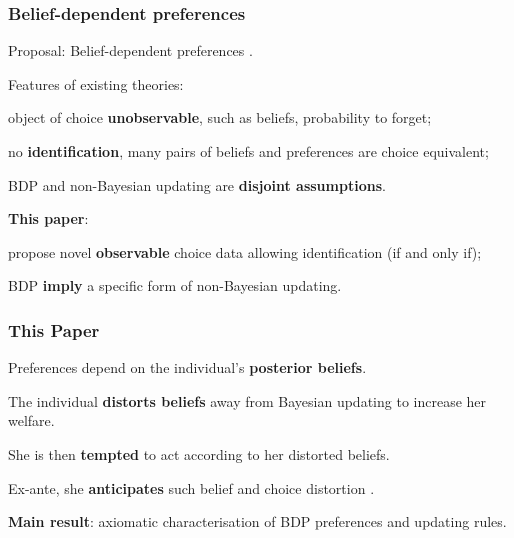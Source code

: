 \documentclass[usenames,dvipsnames,aspectratio=169,11pt, envcountsect, handout]{beamer}
\begin{document}
\begin{frame}\frametitle{Belief-dependent preferences}

	Proposal: Belief-dependent preferences \citep{benabou2016mindful,koszegiUtilityAnticipationPersonal2010}. \pause

	\vfill

	Features of existing theories:

	\vfill

	\begin{wideitemize}
		\item object of choice \textbf{unobservable}, such as beliefs, probability to forget;
		\item no \textbf{identification}, many pairs of beliefs and preferences are choice equivalent;
		\item BDP and non-Bayesian updating are \textbf{disjoint assumptions}.
	\end{wideitemize}

	\vfill \pause

	\textbf{This paper}:
	\vfill
	\begin{wideitemize}
		\item propose novel \textbf{observable} choice data allowing identification (if and only if);
		\item BDP \textbf{imply} a specific form of non-Bayesian updating.
	\end{wideitemize}

\end{frame}

\begin{frame}\frametitle{This Paper}

	Preferences depend on the individual's \textbf{posterior beliefs}.

	\vfill

	The individual \textbf{distorts beliefs} away from Bayesian updating to increase her welfare.

	\vfill

	She is then \textbf{tempted} to act according to her distorted beliefs.

	\vfill

	Ex-ante, she \textbf{anticipates} such belief and choice distortion \citep{cobb-clarkPredictivePowerSelfcontrol2022}.

	\vfill \pause

	\textbf{Main result}: axiomatic characterisation of BDP preferences and updating rules.

\end{frame}
\end{document}
